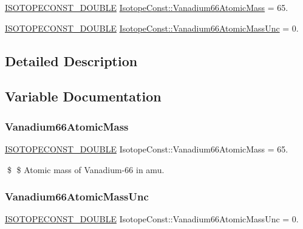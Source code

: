 \begin{DoxyCompactItemize}
\item 
\mbox{\hyperlink{group___isotope_const-_macros_ga8f45a7272ce02c0b4c65c44636ed719a}{I\+S\+O\+T\+O\+P\+E\+C\+O\+N\+S\+T\+\_\+\+D\+O\+U\+B\+LE}} \mbox{\hyperlink{group___isotope_const-_vanadium-_v66_ga9fdbb993d1e83cfe66bc63ef996b86a6}{Isotope\+Const\+::\+Vanadium66\+Atomic\+Mass}} = 65.
\item 
\mbox{\hyperlink{group___isotope_const-_macros_ga8f45a7272ce02c0b4c65c44636ed719a}{I\+S\+O\+T\+O\+P\+E\+C\+O\+N\+S\+T\+\_\+\+D\+O\+U\+B\+LE}} \mbox{\hyperlink{group___isotope_const-_vanadium-_v66_gace09968e43d02db4243f0064c2d9a7e7}{Isotope\+Const\+::\+Vanadium66\+Atomic\+Mass\+Unc}} = 0.
\end{DoxyCompactItemize}


\subsection{Detailed Description}


\subsection{Variable Documentation}
\mbox{\label{group___isotope_const-_vanadium-_v66_ga9fdbb993d1e83cfe66bc63ef996b86a6}} 
\subsubsection{\texorpdfstring{Vanadium66\+Atomic\+Mass}{Vanadium66AtomicMass}}
{\footnotesize\ttfamily \mbox{\hyperlink{group___isotope_const-_macros_ga8f45a7272ce02c0b4c65c44636ed719a}{I\+S\+O\+T\+O\+P\+E\+C\+O\+N\+S\+T\+\_\+\+D\+O\+U\+B\+LE}} Isotope\+Const\+::\+Vanadium66\+Atomic\+Mass = 65.}

\$ \$ Atomic mass of Vanadium-\/66 in amu. \mbox{\label{group___isotope_const-_vanadium-_v66_gace09968e43d02db4243f0064c2d9a7e7}} 
\subsubsection{\texorpdfstring{Vanadium66\+Atomic\+Mass\+Unc}{Vanadium66AtomicMassUnc}}
{\footnotesize\ttfamily \mbox{\hyperlink{group___isotope_const-_macros_ga8f45a7272ce02c0b4c65c44636ed719a}{I\+S\+O\+T\+O\+P\+E\+C\+O\+N\+S\+T\+\_\+\+D\+O\+U\+B\+LE}} Isotope\+Const\+::\+Vanadium66\+Atomic\+Mass\+Unc = 0.}

